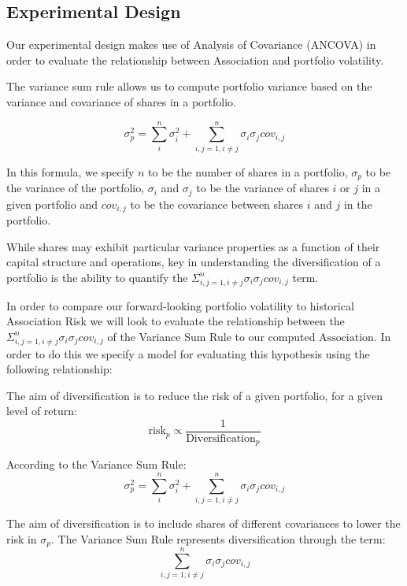 \documentclass[11pt]{article}
\begin{document}
\hypertarget{experimental-design}{%
\subsection{Experimental Design}\label{experimental-design}}

Our experimental design makes use of Analysis of Covariance (ANCOVA) in
order to evaluate the relationship between Association and portfolio
volatility.

The variance sum rule allows us to compute portfolio variance based on
the variance and covariance of shares in a portfolio.

\[ \sigma_{p}^{2} = \sum_{i}^{n} \sigma_{i}^{2} + \sum_{i,j=1, i \ne j}^{n} \sigma_{i} \sigma_{j} cov_{i,j} \]

In this formula, we specify \(n\) to be the number of shares in a
portfolio, \(\sigma_{p}\) to be the variance of the portfolio,
\(\sigma_{i}\) and \(\sigma_{j}\) to be the variance of shares \(i\) or
\(j\) in a given portfolio and \(cov_{i,j}\) to be the covariance
between shares \(i\) and \(j\) in the portfolio.

While shares may exhibit particular variance properties as a function of
their capital structure and operations, key in understanding the
diversification of a portfolio is the ability to quantify the
\(\Sigma_{i,j=1, i \ne j}^{n} \sigma_{i} \sigma_{j} cov_{i,j}\) term.

In order to compare our forward-looking portfolio volatility to
historical Association Risk we will look to evaluate the relationship
between the
\(\Sigma_{i,j=1, i \ne j}^{n} \sigma_{i} \sigma_{j} cov_{i,j}\) of the
Variance Sum Rule to our computed \(\text{Association}\). In order to do
this we specify a model for evaluating this hypothesis using the
following relationship:

The aim of diversification is to reduce the risk of a given portfolio,
for a given level of return:\\
\[\text{risk}_{p} \propto \frac{1}{\text{Diversification}_{p}} \]

According to the Variance Sum Rule:
\[ \sigma_{p}^{2} = \sum_{i}^{n} \sigma_{i}^{2} + \sum_{i,j=1, i \ne j}^{n} \sigma_{i} \sigma_{j} cov_{i,j} \]

The aim of diversification is to include shares of different covariances
to lower the risk in \(\sigma_{p}\). The Variance Sum Rule represents
diversification through the term:\\
\[ \sum_{i,j=1, i \ne j}^{n} \sigma_{i} \sigma_{j} cov_{i,j} \]
\end{document}
